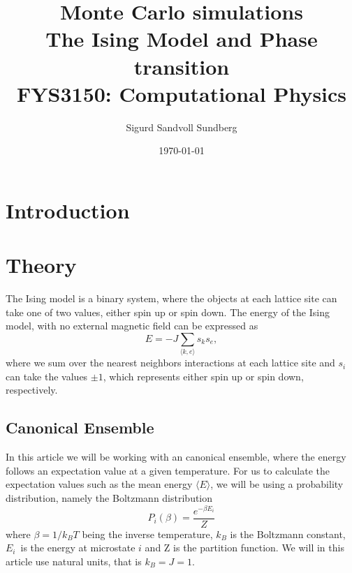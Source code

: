 \documentclass[%
reprint,
nofootinbib,
amsmath,amssymb,
aps,
]{revtex4-1}
\begin{document}
	
\title{Monte Carlo simulations\\
	\normalsize{The Ising Model and Phase transition} \\
	\hrulefill\small{ FYS3150: Computational Physics }\hrulefill}

\author{Sigurd Sandvoll Sundberg}

%

\date{\today}

\begin{abstract}%

\end{abstract}

\maketitle 

\section{Introduction} %

\section{Theory} %
The Ising model is a binary system, where the objects at each lattice site can take one of two values, either spin up or spin down. 
The energy of the Ising model, with no external magnetic field can be expressed as 
\begin{equation}
	E = -J\sum_{\langle k,e \rangle} s_ks_e,
\end{equation}
where we sum over the nearest neighbors interactions at each lattice site and $s_i$ can take the values $\pm 1$, which represents either spin up or spin down, respectively. 

\subsection{Canonical Ensemble}
In this article we will be working with an canonical ensemble, where the energy follows an expectation value at a given temperature. For us to calculate the expectation values such as the mean energy $\langle E \rangle$, we will be using a probability distribution, namely the Boltzmann distribution
\begin{equation}
	P_i(\beta) = \frac{e^{-\beta E_i}}{Z}
\end{equation}
where $\beta = 1/k_BT$ being the inverse temperature, $k_B$ is the Boltzmann constant, $E_i$ is the energy at microstate $i$ and Z is the partition function. We will in this article use natural units, that is $k_B = J = 1$. 
\end{document}
